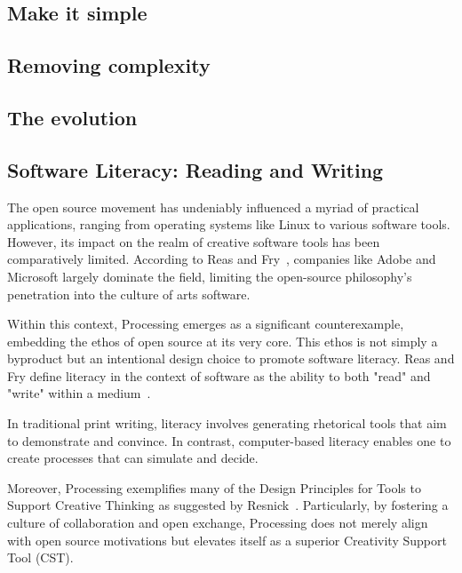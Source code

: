 \subsection{Make it simple}
\subsection{Removing complexity}
\subsection{The evolution}

\subsection{Software Literacy: Reading and Writing}

The open source movement has undeniably influenced a myriad of practical applications, ranging from operating systems like Linux to various software tools. However, its impact on the realm of creative software tools has been comparatively limited. According to Reas and Fry~\parencite[30]{reasProcessingProgrammingHandbook2007}, companies like Adobe and Microsoft largely dominate the field, limiting the open-source philosophy's penetration into the culture of arts software. %

Within this context, Processing emerges as a significant counterexample, embedding the ethos of open source at its very core. This ethos is not simply a byproduct but an intentional design choice to promote software literacy. Reas and Fry define literacy in the context of software as the ability to both "read" and "write" within a medium~\parencite[29]{reasProcessingProgrammingHandbook2007}. %

In traditional print writing, literacy involves generating rhetorical tools that aim to demonstrate and convince. In contrast, computer-based literacy enables one to create processes that can simulate and decide. %

Moreover, Processing exemplifies many of the Design Principles for Tools to Support Creative Thinking as suggested by Resnick~\parencite{resnickDesignPrinciplesTools}. Particularly, by fostering a culture of collaboration and open exchange, Processing does not merely align with open source motivations but elevates itself as a superior Creativity Support Tool (CST). %